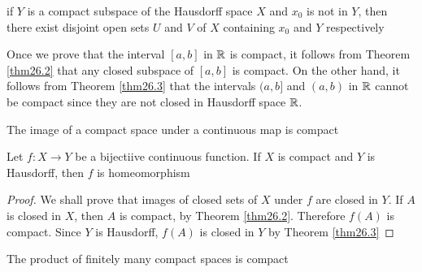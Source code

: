 \documentclass[11pt]{article}
\begin{document}
\begin{lemma}[]
\label{lemma26.4}
if \(Y\) is a compact subspace of the Hausdorff space \(X\) and \(x_0\) is not in \(Y\), then
there exist disjoint open sets \(U\) and \(V\) of \(X\) containing \(x_0\) and \(Y\) respectively
\end{lemma}

\begin{examplle}[]
Once we prove that the interval \([a,b]\) in \(\mathbb{R}\) is compact, it follows from Theorem
\ref{thm26.2} that any closed subspace of \([a,b]\) is compact. On the other hand, it follows from
Theorem \ref{thm26.3} that the intervals \((a,b]\) and \((a,b)\) in \(\mathbb{R}\) cannot be compact since
they are not closed in Hausdorff space \(\mathbb{R}\).
\end{examplle}

\begin{theorem}[]
The image of a compact space under a continuous map is compact
\end{theorem}

\begin{theorem}[]
Let \(f:X\to Y\) be a bijectiive continuous function. If \(X\) is compact and \(Y\) is Hausdorff,
then \(f\) is homeomorphism
\end{theorem}

\begin{proof}
We shall prove that images of closed sets of \(X\) under \(f\) are closed in \(Y\). If \(A\) is
closed in \(X\), then \(A\) is compact, by Theorem \ref{thm26.2}. Therefore \(f(A)\) is compact.
Since \(Y\) is Hausdorff, \(f(A)\) is closed in \(Y\) by Theorem \ref{thm26.3}
\end{proof}

\begin{theorem}[]
The product of finitely many compact spaces is compact
\end{theorem}
\end{document}

